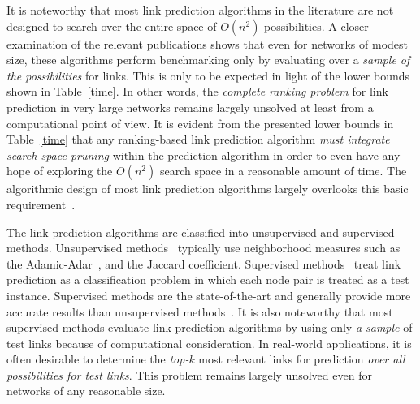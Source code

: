 


It is noteworthy that most link prediction algorithms in the
literature are not designed to search over the entire space of
$O(n^2)$ possibilities. A closer examination of the relevant
publications shows that even for networks of modest size, these
algorithms perform benchmarking  only by evaluating over a {\em
sample of the possibilities} for links. This is only to be expected
in light of the lower bounds shown in Table~\ref{time}.  In other
words, the {\em complete ranking problem} for link prediction in
very large networks remains largely unsolved at least from a
computational point of view. It is evident from the presented lower
bounds in Table~\ref{time} that any ranking-based link prediction
algorithm {\em must integrate search space pruning} within the
prediction algorithm in order to even  have any  hope of exploring
the $O(n^2)$ search space in a reasonable amount of time. The
algorithmic design of most link prediction algorithms largely
overlooks this basic requirement~\cite{chancc,propflow}.

The link prediction algorithms are classified into unsupervised and
supervised methods. Unsupervised methods~\cite{kleinberg} typically
use neighborhood measures such as the Adamic-Adar~\cite{adamic}, and
the Jaccard coefficient. Supervised methods~\cite{propflow} treat
link prediction as a classification problem in which each node pair
is treated as a test instance. Supervised methods are the
state-of-the-art and generally provide more accurate results than
unsupervised methods~\cite{propflow}. It is also noteworthy that
most supervised methods evaluate link prediction algorithms by using
only {\em a sample} of test links because of computational
consideration.  In real-world applications, it is often desirable to
determine the {\em top-$k$} most relevant links for prediction {\em
over all possibilities for test links}. This problem remains largely
unsolved even for networks of any reasonable size.


